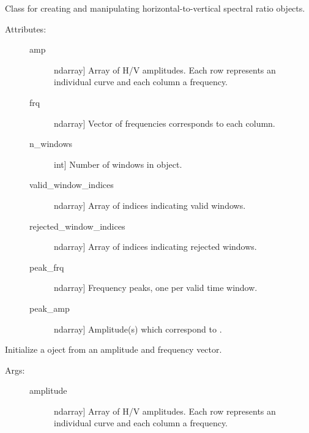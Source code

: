 \documentclass[letterpaper,10pt,english,openany,oneside]{sphinxmanual}
\begin{document}
\begin{fulllineitems}
\label{\detokenize{index:hvsrpy.Hvsr}}
Class for creating and manipulating horizontal-to-vertical
spectral ratio objects.
\begin{description}
\item[{Attributes:}] \leavevmode\begin{description}
\item[{amp}] \leavevmode{[}ndarray{]}
Array of H/V amplitudes. Each row represents an individual
curve and each column a frequency.

\item[{frq}] \leavevmode{[}ndarray{]}
Vector of frequencies corresponds to each column.

\item[{n\_windows}] \leavevmode{[}int{]}
Number of windows in  object.

\item[{valid\_window\_indices}] \leavevmode{[}ndarray{]}
Array of indices indicating valid windows.

\item[{rejected\_window\_indices}] \leavevmode{[}ndarray{]}
Array of indices indicating rejected windows.

\item[{peak\_frq}] \leavevmode{[}ndarray{]}
Frequency peaks, one per valid time window.

\item[{peak\_amp}] \leavevmode{[}ndarray{]}
Amplitude(s) which correspond to .

\end{description}

\end{description}

\begin{fulllineitems}
\label{\detokenize{index:hvsrpy.Hvsr.__init__}}
Initialize a  oject from an amplitude and frequency
vector.
\begin{description}
\item[{Args:}] \leavevmode\begin{description}
\item[{amplitude}] \leavevmode{[}ndarray{]}
Array of H/V amplitudes. Each row represents an individual
curve and each column a frequency.


\end{description}
\end{description}
\end{fulllineitems}
\end{fulllineitems}
\end{document}

